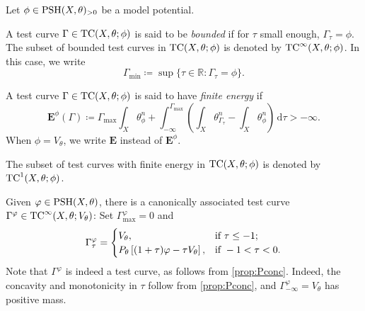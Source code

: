 \begin{definition}\label{def:relattestcurv}
    Let $\phi\in \mathrm{PSH}(X,\theta)_{>0}$ be a model potential.

    A test curve $\Gamma\in \mathrm{TC}(X,\theta;\phi)$ is said to be \emph{bounded} if for $\tau$ small enough, $\Gamma_{\tau}=\phi$. The subset of bounded test curves in $\mathrm{TC}(X,\theta;\phi)$ is denoted by $\mathrm{TC}^{\infty}(X,\theta;\phi)$.
    In this case, we write
    \begin{equation}\label{eq:Gammamin}
    \Gamma_{\min}\coloneqq \sup\{\tau\in \mathbb{R}:\Gamma_{\tau}=\phi\}.
    \end{equation}

    A test curve $\Gamma\in \mathrm{TC}(X,\theta;\phi)$ is said to have \emph{finite energy} if
    \begin{equation}\label{eq:tcfiniteenergy}
    \mathbf{E}^{\phi}(\Gamma)\coloneqq \Gamma_{\max} \int_X \theta_{\phi}^n+\int_{-\infty}^{\Gamma_{\max}} \left(\int_X\theta_{\Gamma_{\tau}}^n-\int_X \theta_{\phi}^n\right)\,\mathrm{d}\tau>-\infty.
    \end{equation}
    When $\phi=V_{\theta}$, we write $\mathbf{E}$ instead of $\mathbf{E}^{\phi}$.

    The subset of test curves with finite energy in $\mathrm{TC}(X,\theta;\phi)$ is denoted by $\mathrm{TC}^1(X,\theta;\phi)$.
\end{definition}

\begin{example}\label{ex:cantest}
    Given $\varphi\in \mathrm{PSH}(X,\theta)$, there is a canonically associated test curve $\Gamma^{\varphi}\in \mathrm{TC}^{\infty}(X,\theta;V_{\theta})$: Set $\Gamma^{\varphi}_{\max}=0$ and
    \[
    \Gamma^{\varphi}_{\tau}=
    \begin{cases}
        V_{\theta},&\textup{if }\tau\leq -1;\\
        P_{\theta}\left[ (1+\tau)\varphi-\tau V_{\theta} \right],& \textup{if }-1<\tau<0.
    \end{cases}
    \]
    Note that $\Gamma^{\varphi}$ is indeed a test curve, as follows from \cref{prop:Pconc}. Indeed, the concavity and monotonicity in $\tau$ follow from \cref{prop:Pconc}, and $\Gamma^\varphi_{-\infty}=V_\theta$ has positive mass.
\end{example}

